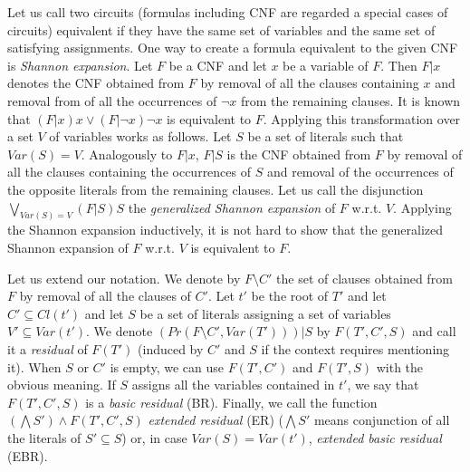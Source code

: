 \documentclass{llncs}
\begin{document}
\begin{comment}
Let $t'$ be the root of $T'$ and let $C' \subseteq Cl(t')$ and let
$S$ be a set of literals assigning a set of variables $V' \subseteq Var(t')$. We denote by
$F(T',C',S)$ the CNF obtained from $F(T')$ by removal of clauses of $C'$ and assigning the literals of $S$ to $true$
(i.e. taking the residual CNF resulting from the assignment). When $S$ or $C'$ is empty, we can use
$F(T',C')$ and $F(T',S)$ with the obvious meaning. We call $F(T',C',S)$ a \emph{residual} of $F(T')$ 
(induced by $C'$ and $S$ if the context requires mentioning it). If
$S$ assigns all the variables contained in $t'$, we say that $F(T',C',S)$ is a \emph{basic residual} (BR).
Finally, we call the function $\bigwedge S' \wedge F(T',C',S)$ \emph{extended residual} (ER) ($\bigwedge S'$
means conjunction of all the literals of $S' \subseteq S$) or, in case $Var(S)=Var(t')$, \emph{extended basic residual} (EBR).
\end{comment}

Let us call two circuits (formulas including CNF are regarded a special cases of circuits)
equivalent if they have the same set of variables and the same set of satisfying assignments.
One way to create a formula equivalent to the given CNF is \emph{Shannon expansion}. Let $F$
be a CNF and let $x$ be a variable of $F$. Then $F|x$ denotes the CNF obtained from $F$ by removal
of all the clauses containing $x$ and removal from of all the occurrences of $\neg x$ from the 
remaining clauses. It is known that $(F|x)x \vee (F| \neg x) \neg x$ is equivalent to $F$. Applying this 
transformation over a set $V$ of variables works as follows. Let $S$ be a set of literals such
that $Var(S)=V$. Analogously to $F|x$, $F|S$ is the CNF obtained from $F$ by removal of all the
clauses containing the occurrences of $S$ and removal of the occurrences of the opposite literals
from the remaining clauses. Let us call the disjunction $\bigvee_{Var(S)=V}(F|S)S$ the
\emph{generalized Shannon expansion} of $F$ w.r.t. $V$. Applying the Shannon expansion inductively, it is
not hard to show that the generalized Shannon expansion of $F$ w.r.t. $V$ is equivalent to $F$.

Let us extend our notation. We denote by $F \setminus C'$ the set of clauses obtained from
$F$ by removal of all the clauses of $C'$. Let $t'$ be the root of $T'$ and let $C' \subseteq Cl(t')$ and let
$S$ be a set of literals assigning a set of variables $V' \subseteq Var(t')$.
We denote $(Pr(F \setminus C',Var(T')))|S$ by $F(T',C',S)$ and call it a \emph{residual} of 
$F(T')$ (induced by $C'$ and $S$ if the context requires mentioning it).
When $S$ or $C'$ is empty, we can use $F(T',C')$ and $F(T',S)$ with the obvious meaning.
If $S$ assigns all the variables contained in $t'$, we say that $F(T',C',S)$ is a \emph{basic residual} (BR).
Finally, we call the function $(\bigwedge S') \wedge F(T',C',S)$ \emph{extended residual} (ER) ($\bigwedge S'$
means conjunction of all the literals of $S' \subseteq S$) or, in case $Var(S)=Var(t')$, \emph{extended basic residual} (EBR).
\end{document}
